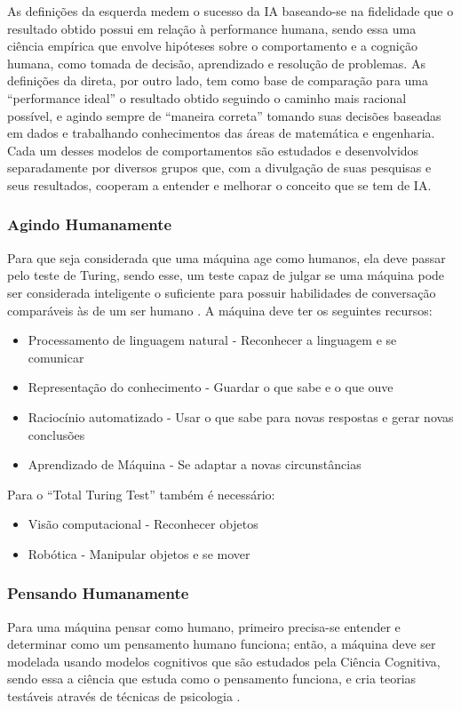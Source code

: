 \documentclass[
	12pt,				%
	openright,			%
	oneside,			%
	a4paper,			%
	english,			%
	spanish,			%
	brazil				%
	]{abntex2}
\begin{document}
	As definições da esquerda medem o sucesso da IA baseando-se na fidelidade que o resultado obtido possui em relação à performance humana, sendo essa uma ciência empírica que envolve hipóteses sobre o comportamento e a cognição humana, como tomada de decisão, aprendizado e resolução de problemas. As definições da direta, por outro lado, tem como base de comparação para uma ``performance ideal'' o resultado obtido seguindo o caminho mais racional possível, e agindo sempre de ``maneira correta'' tomando suas decisões baseadas em dados e trabalhando conhecimentos das áreas de matemática e engenharia. Cada um desses modelos de comportamentos são estudados e desenvolvidos separadamente por diversos grupos que, com a divulgação de suas pesquisas e seus resultados, cooperam a entender e melhorar o conceito que se tem de IA. \cite{norvig}
	 
	\subsubsection*{Agindo Humanamente}
		Para que seja considerada que uma máquina age como humanos, ela deve passar pelo teste de Turing, sendo esse, um teste capaz de julgar se uma máquina pode ser considerada inteligente o suficiente para possuir habilidades de conversação comparáveis às de um ser humano \cite{turing}. A máquina deve ter os seguintes recursos:
		
		\begin{itemize}
  			\item Processamento de linguagem natural - Reconhecer a linguagem e se comunicar
  			\item Representação do conhecimento - Guardar o que sabe e o que ouve
  			\item Raciocínio automatizado - Usar o que sabe para novas respostas e gerar novas conclusões
  			\item Aprendizado de Máquina - Se adaptar a novas circunstâncias
  		\end{itemize}
  			
  			Para o ``Total Turing Test'' também é necessário:
  			
  		\begin{itemize}
  			\item Visão computacional - Reconhecer objetos
  			\item Robótica - Manipular objetos e se mover
		\end{itemize}
		
	\subsubsection*{Pensando Humanamente}
		Para uma máquina pensar como humano, primeiro precisa-se entender e determinar como um pensamento humano funciona; então, a máquina deve ser modelada usando modelos cognitivos que são estudados pela Ciência Cognitiva, sendo essa a ciência que estuda como o pensamento funciona, e cria teorias testáveis através de técnicas de psicologia \cite{wilson_keil}.
		
\end{document}
